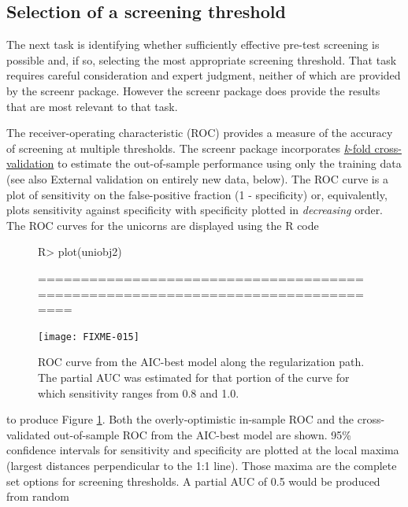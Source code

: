 \documentclass[11pt]{report}
\renewenvironment{Schunk}{\vspace{\topsep}}{\vspace{\topsep}}
\begin{document}
\subsection*{Selection of a screening threshold}

The next task is identifying whether sufficiently effective pre-test
screening is possible and, if so, selecting the most appropriate
screening threshold. That task requires careful consideration and
expert judgment, neither of which are provided by the \textsf{screenr}
package. However the \textsf{screenr} package does provide the results that are
most relevant to that task.

The receiver-operating characteristic (ROC) provides a measure of the
accuracy of screening at multiple thresholds. The \textsf{screenr} package
incorporates
\href{https://machinelearningmastery.com/k-fold-cross-validation/}{\emph{k}-fold
cross-validation}
to estimate the out-of-sample performance using only the training data
(see also \textsf{External validation on entirely new data}, below).
The ROC curve is a plot of
sensitivity on the false-positive fraction (1 - specificity) or,
equivalently, plots sensitivity against specificity with specificity plotted
in \emph{decreasing} order. The ROC curves for the unicorns are displayed
using the \textsf{R} code
\begin{figure}[!h]
  \begin{center}
\begin{Schunk}
\begin{Sinput}
R> plot(uniobj2)
\end{Sinput}
\begin{Soutput}
================================================================================
\end{Soutput}
\end{Schunk}
\texttt{[image: FIXME-015]}
\caption{ROC curve from the AIC-best model along the regularization
  path.  The partial AUC was estimated for that portion of the curve
  for which sensitivity ranges from 0.8 and 1.0.}
\label{fig:f2}
\end{center}
\end{figure}
to produce Figure \ref{fig:f2}.  Both the overly-optimistic in-sample
ROC and the cross-validated out-of-sample ROC from the AIC-best model
are shown. 95\% confidence intervals for sensitivity and specificity
are plotted at the local maxima (largest distances perpendicular to
the 1:1 line). Those maxima are the complete set options for screening
thresholds.  A partial AUC of 0.5 would be produced from random
\end{document}
